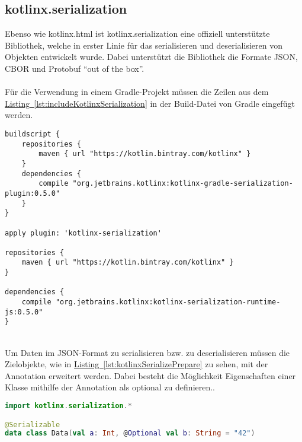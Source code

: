 \subsection{kotlinx.serialization}\label{sec:kotlinxSerialization}
Ebenso wie kotlinx.html ist kotlinx.serialization \cite{kotlinxSerialization} eine offiziell unterstützte Bibliothek, welche in erster Linie für das serialisieren und deserialisieren von Objekten entwickelt wurde. Dabei unterstützt die Bibliothek die Formate \gls{JSON}, \gls{CBOR} und \gls{Protobuf} \enquote{out of the box}.\\
\\
Für die Verwendung in einem Gradle-Projekt müssen die Zeilen aus dem \hyperref[lst:includeKotlinxSerialization]{Listing~\ref{lst:includeKotlinxSerialization}} in der Build-Datei von Gradle eingefügt werden.
\\
\begin{lstlisting}[style=lstStyleFramed, language=Gradle, caption={Einbindung der Bibliothek kotlinx.serialization mittels Gradle}, label=lst:includeKotlinxSerialization, float]
buildscript {
	repositories {
		maven { url "https://kotlin.bintray.com/kotlinx" }
	}
	dependencies {
		compile "org.jetbrains.kotlinx:kotlinx-gradle-serialization-plugin:0.5.0"
	}
}

apply plugin: 'kotlinx-serialization'

repositories {
	maven { url "https://kotlin.bintray.com/kotlinx" }
}

dependencies {
	compile "org.jetbrains.kotlinx:kotlinx-serialization-runtime-js:0.5.0"
}
\end{lstlisting}
\\
Um Daten im \gls{JSON}-Format zu serialisieren bzw. zu deserialisieren müssen die Zielobjekte, wie in \hyperref[lst:kotlinxSerializePrepare]{Listing~\ref{lst:kotlinxSerializePrepare}} zu sehen, mit der Annotation  erweitert werden. Dabei besteht die Möglichkeit Eigenschaften einer Klasse mithilfe der Annotation  als optional zu definieren..
\\
\begin{lstlisting}[style=lstStyleFramed, language=Kotlin, caption={Beispiel: Model-Erweiterung für Unterstützung der Kotlinx.serialization Bibliothek (verändert nach \cite{kotlinxSerializationExample})}, label=lst:kotlinxSerializePrepare, float]
import kotlinx.serialization.*

@Serializable
data class Data(val a: Int, @Optional val b: String = "42")
\end{lstlisting}

